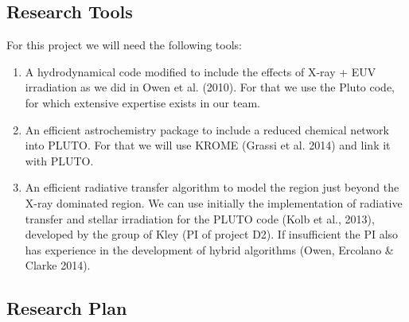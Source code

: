 \documentclass[10pt,fleqn,twoside]{article}
\begin{document}


\subsection{Research Tools}

For this project we will need the following tools: 
\begin{enumerate}
\item A hydrodynamical code modified to include the
  effects of X-ray + EUV irradiation as we did in Owen et al. (2010). For
  that we use the Pluto code, for which extensive expertise
  exists in our team. 
\item An efficient astrochemistry package to include a reduced
  chemical network into PLUTO. For that we will use KROME (Grassi et
  al. 2014) and link it with PLUTO. 
\item An efficient radiative transfer algorithm to model the region
  just beyond the X-ray dominated region. We can use initially the
  implementation of radiative transfer and stellar irradiation
for the PLUTO code (Kolb et al., 2013), developed by the group of Kley
(PI of project D2). If insufficient the PI also has experience in the
development of hybrid algorithms  (Owen, Ercolano \& Clarke 2014). 

\end{enumerate}

\subsection{Research Plan} 
\end{document}
